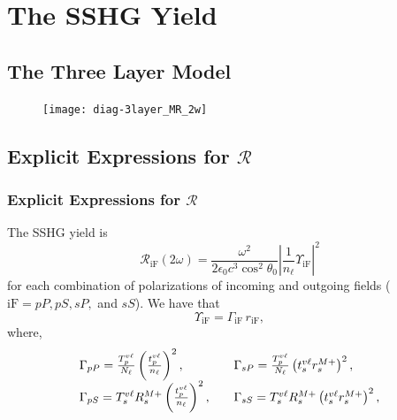 \documentclass{beamer}
\begin{document}

\section{The SSHG Yield}



\subsection{The Three Layer Model}

\begin{frame}
\begin{figure}
\centering
\texttt{[image: diag-3layer\_MR\_2w]}
\end{figure}
\end{frame}



\subsection{Explicit Expressions for \texorpdfstring{$\mathcal{R}$}{R}}

\begin{frame}
\frametitle{Explicit Expressions for $\mathcal{R}$}
The SSHG yield is
\begin{equation*}
\mathcal{R}_{\mathrm{iF}}(2\omega) =
\frac{\omega^{2}}{2\epsilon_{0}c^3\cos^{2}\theta_{0}}
\left\vert\frac{1}{n_{\ell}}\Upsilon_{\mathrm{iF}}\right\vert^{2} 
\end{equation*}
for each combination of polarizations of incoming and outgoing fields ($\mathrm{iF} = pP,
pS, sP,$ and $sS$). We have that
\begin{equation*}\label{eq:mc25}
\Upsilon_{\mathrm{iF}} = \Gamma_{\mathrm{iF}}\,r_{\mathrm{iF}},
\end{equation*}
where,
$$
\begin{array}{ l l }
\Gamma_{pP} =
\frac{T^{v\ell}_{p}}{N_{\ell}}
\left(\frac{t^{v\ell}_{p}}{n_{\ell}}\right)^{2},
&
\Gamma_{sP}=
\frac{T^{v\ell}_{p}}{N_{\ell}}
\left(t^{v\ell}_{s}r^{M+}_{s}\right)^{2},\quad\\
\Gamma_{pS} =
T_{s}^{v\ell}R^{M+}_{s}
\left(\frac{t^{v\ell}_{p}}{n_{\ell}}\right)^{2},\quad
&
\Gamma_{sS} = 
T_{s}^{v\ell}R^{M+}_{s}\left(t^{v\ell}_{s}r^{M+}_{s}\right)^{2},
\end{array}
$$
\end{frame}
\end{document}
